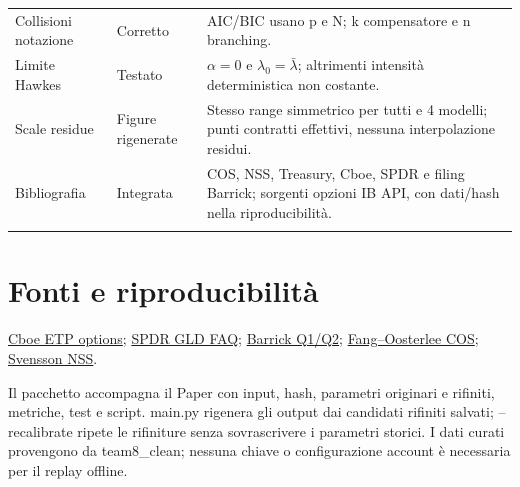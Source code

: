 \documentclass[10pt,a4paper]{article}
\begin{document}
\begin{longtable}{p{}p{}p{}}
Collisioni notazione & Corretto & AIC/BIC usano p e N; k compensatore e n branching. \\ \addlinespace
Limite Hawkes & Testato & $\alpha=0$ e $\lambda_0=\bar\lambda$; altrimenti intensità deterministica non costante. \\ \addlinespace
Scale residue & Figure rigenerate & Stesso range simmetrico per tutti e 4 modelli; punti contratti effettivi, nessuna interpolazione residui. \\ \addlinespace
Bibliografia & Integrata & COS, NSS, Treasury, Cboe, SPDR e filing Barrick; sorgenti opzioni IB API, con dati/hash nella riproducibilità. \\ \addlinespace
\bottomrule\end{longtable}
\section{Fonti e riproducibilità}
\href{https://www.cboe.com/exchange-traded-stock/etp-options-spec}{Cboe ETP options}; \href{https://files.spdrgoldshares.com/spdr-cms/2025-10/GLD-FAQs-January-2025.pdf}{SPDR GLD FAQ}; \href{https://www.barrick.com/English/investors/quarterly-reports/default.aspx}{Barrick Q1/Q2}; \href{https://ir.cwi.nl/pub/13283}{Fang--Oosterlee COS}; \href{https://www.nber.org/papers/w4871}{Svensson NSS}.
\par Il pacchetto accompagna il Paper con input, hash, parametri originari e rifiniti, metriche, test e script. main.py rigenera gli output dai candidati rifiniti salvati; --recalibrate ripete le rifiniture senza sovrascrivere i parametri storici. I dati curati provengono da team8\_clean; nessuna chiave o configurazione account è necessaria per il replay offline.
\end{document}
